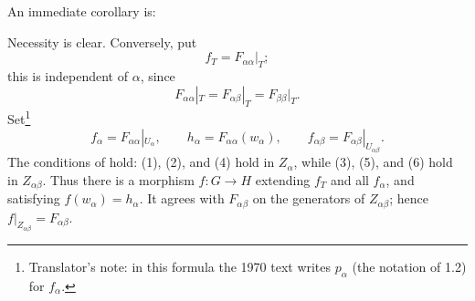 An immediate corollary is:


Necessity is clear. Conversely, put
\[
  f_T=F_{\alpha\alpha}|_T;
\]
this is independent of \(\alpha\), since
\[
  F_{\alpha\alpha}|_T
   =F_{\alpha\beta}|_T
   =F_{\beta\beta}|_T.
\]
Set\footnote{Translator's note: in this formula the 1970 text writes \(p_\alpha\) (the
notation of 1.2) for \(f_\alpha\).}
\[
  f_\alpha=F_{\alpha\alpha}|_{U_\alpha},\qquad
  h_\alpha=F_{\alpha\alpha}(w_\alpha),\qquad
  f_{\alpha\beta}=F_{\alpha\beta}|_{U_{\alpha\beta}}.
\]
The conditions of  hold: (1), (2), and (4) hold in
\(Z_\alpha\), while (3), (5), and (6) hold in \(Z_{\alpha\beta}\).
Thus there is a morphism \(f:G\to H\) extending \(f_T\) and all
\(f_\alpha\), and satisfying \(f(w_\alpha)=h_\alpha\). It agrees
with \(F_{\alpha\beta}\) on the generators of \(Z_{\alpha\beta}\);
hence \(f|_{Z_{\alpha\beta}}=F_{\alpha\beta}\).
